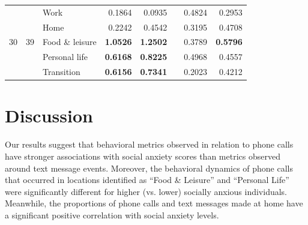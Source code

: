 \begin{table}
\begin{center}
\begin{tabular}{ l l @{\hskip 0.5in} l @{\hskip 0.5in} r r r r r}
        \hline
        						&						& Work					& 0.1864				& 0.0935				&	& 0.4824				& 0.2953				\\
        						&						& Home					& 0.2242				& 0.4542				&	& 0.3195				& 0.4708				\\
        30						& 39					& Food \& leisure		& \textbf{1.0526}				& \textbf{1.2502}				&	& 0.3789				& \textbf{0.5796}				\\
        						&						& Personal life			& \textbf{0.6168}				& \textbf{0.8225}				&	& 0.4968				& 0.4557				\\
        						&						& Transition			& \textbf{0.6156}				& \textbf{0.7341}				&	& 0.2023				& 0.4212				\\
       
	\bottomrule
    \end{tabular}
\end{center}

\end{table}



\section{Discussion}
\label{sec:discussion}




Our results suggest that behavioral metrics observed in relation to phone calls have stronger associations with social anxiety scores than metrics observed around text message events. 
Moreover, the behavioral dynamics of phone calls that occurred in locations identified as ``Food \& Leisure'' and ``Personal Life'' were significantly different for higher (vs. lower) socially anxious individuals. Meanwhile, the proportions of phone calls and text messages made at home have a significant positive correlation with social anxiety levels.

